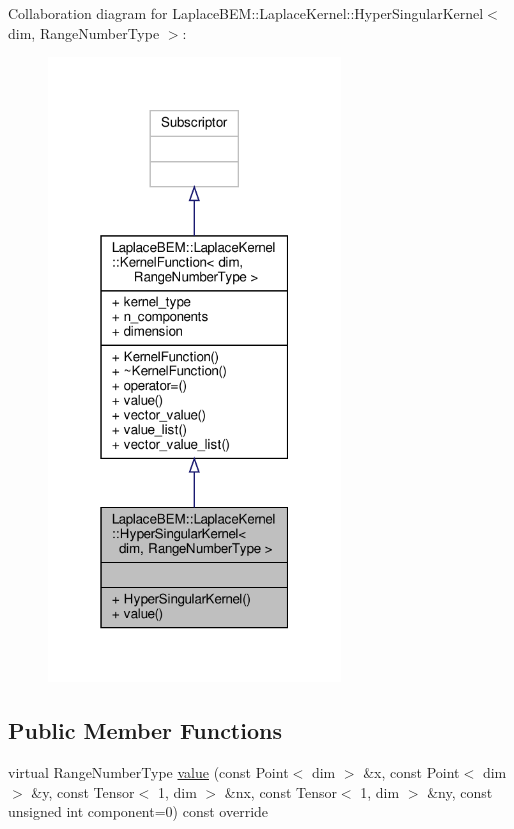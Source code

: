 Collaboration diagram for Laplace\+B\+EM\+:\+:Laplace\+Kernel\+:\+:Hyper\+Singular\+Kernel$<$ dim, Range\+Number\+Type $>$\+:\nopagebreak
\begin{figure}[H]
\begin{center}
\leavevmode
\includegraphics[width=220pt]{classLaplaceBEM_1_1LaplaceKernel_1_1HyperSingularKernel__coll__graph}
\end{center}
\end{figure}
\subsection*{Public Member Functions}
\begin{DoxyCompactItemize}
\item 
virtual Range\+Number\+Type \hyperlink{classLaplaceBEM_1_1LaplaceKernel_1_1HyperSingularKernel_a02811fc623d2bb605c5eeb22712bdfd6}{value} (const Point$<$ dim $>$ \&x, const Point$<$ dim $>$ \&y, const Tensor$<$ 1, dim $>$ \&nx, const Tensor$<$ 1, dim $>$ \&ny, const unsigned int component=0) const override
\end{DoxyCompactItemize}
